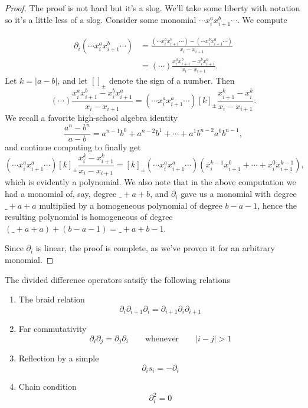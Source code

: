 \documentclass{article}
\begin{document}
\begin{proof}
    The proof is not hard but it's a slog. We'll take some liberty with notation so it's a little less of a slog. 
    Consider some monomial $\cdots x_i^a x_{i+1}^b \cdots$. We compute

    \begin{align*}
        \partial_i(\cdots x_i^a x_{i+1}^b \cdots) &= \frac{(\cdots x_i^a x_{i+1}^b \cdots) - (\cdots x_i^b x_{i+1}^a \cdots)}{x_i-x_{i+1}} \\
                                                                          &= (\cdots) \frac{x_i^ax_{i+1}^b - x_i^bx_{i+1}^a}{x_i-x_{i+1}}.
    \end{align*}
    Let $k = |a-b|$, and let $[]_\pm$ denote the sign of a number. Then
    \[
        (\cdots) \frac{x_i^ax_{i+1}^b - x_i^bx_{i+1}^a}{x_i-x_{i+1}} = (\cdots x_i^ax_{i+1}^a \cdots)[k]_\pm\frac{x_{i+1}^k - x_i^k}{x_i-x_{i+1}}.
    \]
    We recall a favorite high-school algebra identity
    \[
        \frac{a^n-b^n}{a-b} = a^{n-1}b^0 + a^{n-2}b^1 + \cdots + a^1b^{n-2}a^0b^{n-1},
    \]
    and continue computing to finally get
    \[
        (\cdots x_i^ax_{i+1}^a \cdots)[k]_\pm\frac{x_i^k - x_{i+1}^k}{x_i-x_{i+1}} = [k]_\pm(\cdots x_i^ax_{i+1}^a \cdots)(x_i^{k-1}x_{i+1}^0 + \cdots + x_i^0 x_{i+1}^{k-1}),
    \]
    which is evidently a polynomial. 
    We also note that in the above computation we had a monomial of, say, degree $\_ + a + b$, and $\partial_i$ gave us a monomial with degree $\_ + a + a$ multiplied by a homogeneous polynomial of degree $b - a - 1$, hence the resulting polynomial is homogeneous of degree $(\_ + a + a) + (b - a - 1) = \_ + a + b - 1$.

    Since $\partial_i$ is linear, the proof is complete, as we've proven it for an arbitrary monomial.
\end{proof}

\begin{theorem}
    The divided difference operators satsify the following relations
    \begin{enumerate}[label=(\alph*)]
        \item The braid relation
            \begin{equation}
                \partial_i\partial_{i+1}\partial_i = \partial_{i+1}\partial_i\partial_{i+1}
            \end{equation}
        \item Far commutativity
            \[
                \partial_i\partial_j = \partial_j\partial_i\qquad \text{whenever}\qquad|i-j| > 1
            \]
        \item Reflection by a simple
            \[
                \partial_is_i = -\partial_i
            \]
        \item Chain condition
            \[
                \partial_i^2 = 0
            \]
    \end{enumerate}
\end{theorem}
\end{document}
